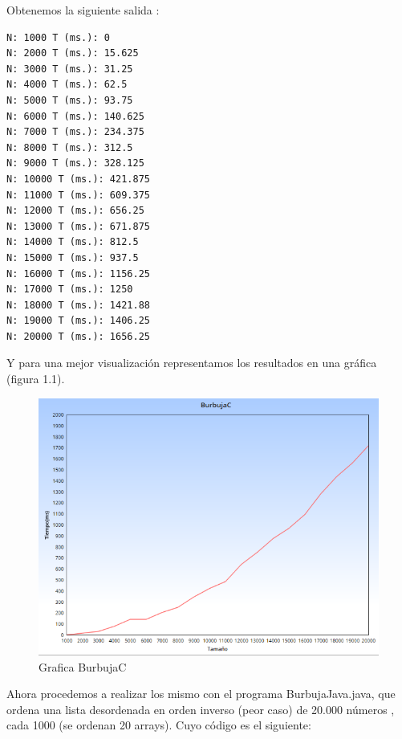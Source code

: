	Obtenemos la siguiente salida :\\
	
	\lstset{language=C}
	\begin{lstlisting}[frame=single]
N: 1000 T (ms.): 0
N: 2000 T (ms.): 15.625
N: 3000 T (ms.): 31.25
N: 4000 T (ms.): 62.5
N: 5000 T (ms.): 93.75
N: 6000 T (ms.): 140.625
N: 7000 T (ms.): 234.375
N: 8000 T (ms.): 312.5
N: 9000 T (ms.): 328.125
N: 10000 T (ms.): 421.875
N: 11000 T (ms.): 609.375
N: 12000 T (ms.): 656.25
N: 13000 T (ms.): 671.875
N: 14000 T (ms.): 812.5
N: 15000 T (ms.): 937.5
N: 16000 T (ms.): 1156.25
N: 17000 T (ms.): 1250
N: 18000 T (ms.): 1421.88
N: 19000 T (ms.): 1406.25
N: 20000 T (ms.): 1656.25
	\end{lstlisting} 
	
	Y para una mejor visualización representamos los resultados en una gráfica (figura 1.1).\\
	
	\begin{figure}[htb]
		\centering
		\includegraphics[width=1.0\textwidth]{./imagenes/3}
		\caption{Grafica BurbujaC} \label{fig:1}
	\end{figure}
	
	Ahora procedemos a realizar los mismo con el programa BurbujaJava.java, 
	que ordena una lista desordenada en orden inverso (peor caso) de 20.000 números , cada 1000 (se ordenan 20 arrays). Cuyo código es el siguiente: \\
	
